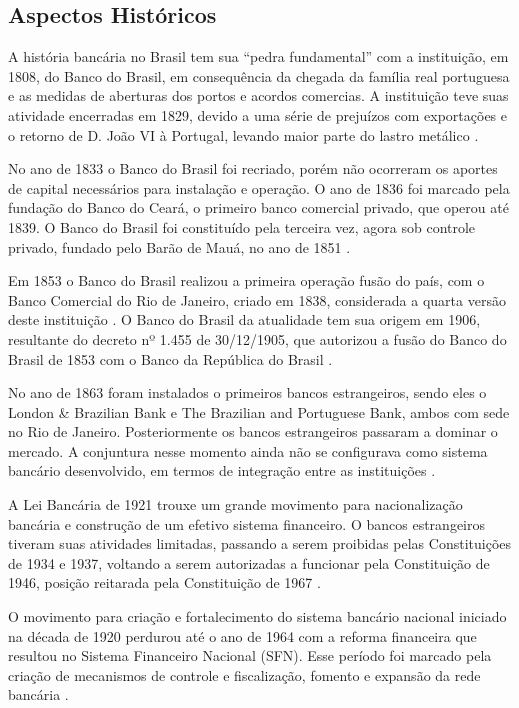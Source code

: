 \documentclass[
  12pt,
  12pt,
  openright,
  oneside,
  a4paper,
  chapter=TITLE,
  section=TITLE,
  subsection=TITLE,
  subsubsection=TITLE,
  english,
  portugues,
  sumario=tradicional]{abntex2}
\begin{document}
\subsection{Aspectos Históricos}

A história bancária no Brasil tem sua ``pedra fundamental'' com a instituição, em 1808, do Banco do Brasil, em consequência da chegada da família real portuguesa e as medidas de aberturas dos portos e acordos comercias. A instituição teve suas atividade encerradas em 1829, devido a uma série de prejuízos com exportações e o retorno de D. João VI à Portugal, levando maior parte do lastro metálico \cite{costaneto:2004, camargo:2009}.

No ano de 1833 o Banco do Brasil foi recriado, porém não ocorreram os aportes de capital necessários para instalação e operação. O ano de 1836 foi marcado pela fundação do Banco do Ceará, o primeiro banco comercial privado, que operou até 1839. O Banco do Brasil foi constituído pela terceira vez, agora sob controle privado, fundado pelo Barão de Mauá, no ano de 1851 \cite{costaneto:2004, camargo:2009}.

Em 1853 o Banco do Brasil realizou a primeira operação fusão do país, com o Banco Comercial do Rio de Janeiro, criado em 1838, considerada a quarta versão deste instituição \cite{camargo:2009}. O Banco do Brasil da atualidade tem sua origem em 1906, resultante do decreto nº 1.455 de 30/12/1905, que autorizou a fusão do Banco do Brasil de 1853 com o Banco da República do Brasil \cite{camargo:2009, Lei:1455:1905, costaneto:2004}.

No ano de 1863 foram instalados o primeiros bancos estrangeiros, sendo eles o London \& Brazilian Bank e The Brazilian and Portuguese Bank, ambos com sede no Rio de Janeiro. Posteriormente os bancos estrangeiros passaram a dominar o mercado. A conjuntura nesse momento ainda não se configurava como sistema bancário desenvolvido, em termos de integração entre as instituições \cite{camargo:2009, guimaraes:2011, mendes:2014}.

A Lei Bancária de 1921 trouxe um grande movimento para nacionalização bancária e construção de um efetivo sistema financeiro. O bancos estrangeiros tiveram suas atividades limitadas, passando a serem proibidas pelas Constituições de 1934 e 1937, voltando a serem autorizadas a funcionar pela Constituição de 1946, posição reitarada pela Constituição de 1967 \cite{camargo:2009, decreto:1921, guimaraes:2011}.

O movimento para criação e fortalecimento do sistema bancário nacional iniciado na década de 1920 perdurou até o ano de 1964 com a reforma financeira que resultou no Sistema Financeiro Nacional (SFN). Esse período foi marcado pela criação de mecanismos de controle e fiscalização, fomento e expansão da rede bancária \cite{camargo:2009, guimaraes:2011}.
\end{document}
